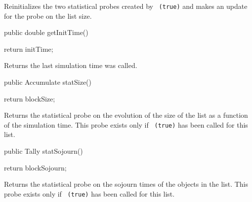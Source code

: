   \begin{tabb} Reinitializes the two statistical probes created by
   ~\texttt{(true)} and makes an update for the
   probe on the list size.
  \end{tabb}
\begin{htmlonly}
\end{htmlonly}
\begin{code}

   public double getInitTime()\begin{hide} {
      return initTime;
   }\end{hide}
\end{code}
\begin{tabb}   Returns the last simulation time  was called.
\end{tabb}
\begin{htmlonly}
\end{htmlonly}
\begin{code}

   public Accumulate statSize() \begin{hide}   {
       return blockSize;
   }\end{hide}
\end{code}
  \begin{tabb}  Returns the statistical probe on the evolution of the size of
   the list as a function of the simulation time.  This probe
   exists only if ~\texttt{(true)}
   has been called for this list.
  \end{tabb}
\begin{htmlonly}
\end{htmlonly}
\begin{code}

   public Tally statSojourn() \begin{hide}  {
      return blockSojourn;
   }\end{hide}
\end{code}
  \begin{tabb}  Returns the statistical probe on the sojourn times of the objects in
   the list.  This probe exists
   only if ~\texttt{(true)} has been called for this list.
  \end{tabb}
\begin{htmlonly}
\end{htmlonly}
